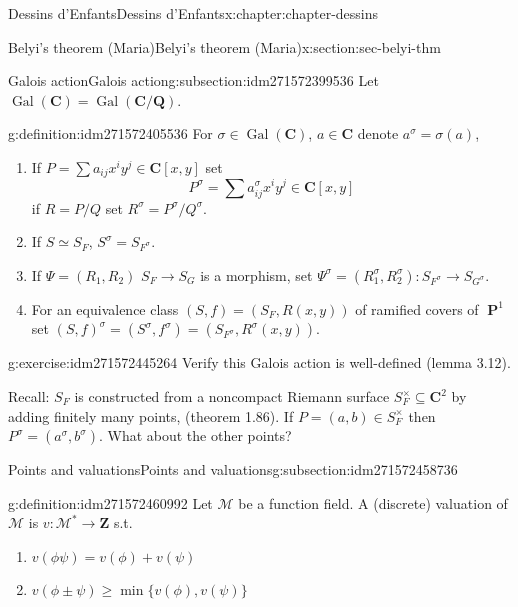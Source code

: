 \documentclass[oneside,10pt,]{book}
\numberwithin{equation}{section}
\newcommand{\lb}{[}
\newcommand{\rb}{]}
\newcommand{\ZZ}{\mathbf{Z}}
\newcommand{\QQ}{\mathbf{Q}}
\newcommand{\CC}{\mathbf{C}}
\newcommand{\Gal}[2]{\operatorname{Gal}(#1/#2)}
\DeclareMathOperator{\PP}{\mathbf{P}}
\begin{document}
\begin{chapterptx}{Dessins d'Enfants}{}{Dessins d'Enfants}{}{}{x:chapter:chapter-dessins}
\begin{sectionptx}{Belyi's theorem (Maria)}{}{Belyi's theorem (Maria)}{}{}{x:section:sec-belyi-thm}
%
\begin{subsectionptx}{Galois action}{}{Galois action}{}{}{g:subsection:idm271572399536}
Let \(\operatorname{Gal}(\CC) = \Gal{\CC}{\QQ}\).%
\begin{definition}{}{g:definition:idm271572405536}%
For \(\sigma \in \operatorname{Gal}(\CC)\), \(a\in \CC\) denote \(a^\sigma = \sigma(a)\),%
\begin{enumerate}
\item{}If \(P = \sum a_{ij} x^iy^j \in \CC\lb x,y\rb\) set%
\begin{equation*}
P^\sigma = \sum a^\sigma_{ij} x^iy^j \in \CC\lb x,y\rb
\end{equation*}
if \(R = P/Q\) set \(R^\sigma = P^\sigma / Q^\sigma\).%
\item{}If \(S \simeq S_F\), \(S^\sigma = S_{F^\sigma}\).%
\item{}If \(\Psi = (R_1, R_2)\) \(S_F\to S_G\) is a morphism, set \(\Psi^ \sigma = (R_1^\sigma , R_2 ^\sigma) \colon S_{F^\sigma} \to S_{G^\sigma}\).%
\item{}For an equivalence class \((S,f) = (S_F, R(x,y))\) of ramified covers of \(\PP^1\) set \((S,f)^\sigma = (S^\sigma, f^\sigma) = (S_{F^\sigma}, R^\sigma (x,y))\).%
\end{enumerate}
%
\end{definition}
\begin{inlineexercise}{}{g:exercise:idm271572445264}%
Verify this Galois action is well-defined (lemma 3.12).%
\end{inlineexercise}
Recall: \(S_F\) is    constructed from a noncompact Riemann surface \(S_F^\times \subseteq \CC^2\) by adding finitely many points, (theorem 1.86). If \(P=  (a,b) \in S_F^\times\) then \(P^\sigma = (a^\sigma, b^\sigma)\). What about the other points?%
\end{subsectionptx}
%
%
\typeout{************************************************}
\typeout{************************************************}
%
\begin{subsectionptx}{Points and valuations}{}{Points and valuations}{}{}{g:subsection:idm271572458736}
\begin{definition}{}{g:definition:idm271572460992}%
Let \(\mathcal M\) be a function field. A (discrete) valuation of \(\mathcal M\) is \(v \colon \mathcal M^* \to \ZZ\) s.t.%
\begin{enumerate}
\item{}\(v(\phi\psi) = v(\phi)  + v(\psi)\)%
\item{}\(v(\phi\pm\psi) \ge \min\{ v(\phi)  , v(\psi)\}\)%

\end{enumerate}
\end{definition}
\end{subsectionptx}
\end{sectionptx}
\end{chapterptx}
\end{document}
